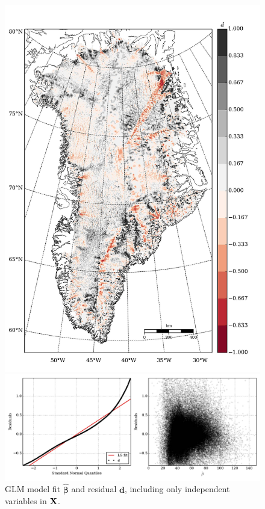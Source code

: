 \begin{figure}
\begin{minipage}[b]{0.47\linewidth}
    \includegraphics[width=1.0\textwidth]{images/greenland/stats/GLM_resid_ind_only.jpg}
  \end{minipage}
  \begin{minipage}[b]{0.99\linewidth}
    \includegraphics[width=1.0\textwidth]{images/greenland/stats/GLM_resid-NQ_ind_only.jpg}
  \end{minipage}
  \caption[]{GLM model fit $\bm{\hat{\beta}}$ and residual $\mathbf{d}$, including only independent variables in $\mathbf{X}$.}
\end{figure}



